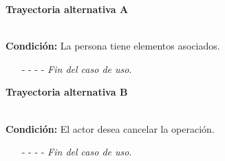 	\hypertarget{CU3-3:TAA}{\textbf{Trayectoria alternativa A}}\\
	\noindent \textbf{Condición:} La persona tiene elementos asociados.
	\begin{enumerate}
		\UCpaso[\UCsist] Muestra el mensaje  en la pantalla .
		\item[- -] - - {\em {Fin del caso de uso}}.%
	\end{enumerate}
	\hypertarget{CU3-3:TAB}{\textbf{Trayectoria alternativa B}}\\
	\noindent \textbf{Condición:} El actor desea cancelar la operación.
	\begin{enumerate}
		\UCpaso[\UCactor] Solicita cancelar la operación oprimiendo el botón  de la ventana emergente.
		\UCpaso[\UCsist] Muestra la pantalla .
		\item[- -] - - {\em {Fin del caso de uso}}.%
	\end{enumerate}
